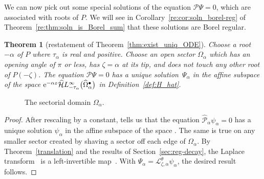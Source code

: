 \documentclass[10pt,a4paper]{amsart}
\newcommand{\singexp}[2]{\mathcal{H}L^\infty_{#1, #2}}
\newcommand{\singexpalg}[1]{\singexp{#1}{\bullet}}
\newcommand{\dualsingexp}[1]{\widehat{\mathcal{H}}L^\infty_{#1}}
\newcommand{\laplace}{\mathcal{L}}
\numberwithin{equation}{section}
\newtheorem{Theorem}{Theorem}[section]
\begin{document}
We can now pick out some special solutions of the equation $\mathcal{P}\Psi = 0$, which are associated with roots of $P$. We will see in Corollary~\ref{re:cor:soln_borel-reg} of Theorem~\ref{re:thm:soln_is_Borel_sum} that these solutions are Borel regular.
\begin{Theorem}[restatement of Theorem~\ref{thm:exist_uniq_ODE}]\label{re:thm:exist_uniq_ODE}
Choose a root $-\alpha$ of $P$ where $\tau_\alpha$ is real and positive. Choose an open sector $\Omega_\alpha$ which has an opening angle of $\pi$ or less, has $\zeta = \alpha$ at its tip, and does not touch any other root of $P(-\zeta)$. The equation $\mathcal{P}\Psi = 0$ has a unique solution~$\Psi_\alpha$ in the affine subspace
\smash{${\rm e}^{-\alpha z} \bigl[ z^{-\tau_\alpha} + \dualsingexp{-\tau_\alpha-1}\bigl(\widehat{\Omega}_\alpha^\bullet\bigr) \bigr] $}
of the space ${\rm e}^{-\alpha z} \dualsingexp{-\tau_\alpha}\bigl(\widehat{\Omega}_\alpha^\bullet\bigr)$ in Definition~{\rm\ref{def:H_hat}}.
\end{Theorem}
\begin{figure}[!ht]\centering\vspace{-18mm}
\hspace*{-25mm}\vspace{-12mm}

\caption{The sectorial domain $\Omega_\alpha$.}\label{fig:sectorial_domain--with roots P}
\end{figure}
\begin{proof}
After rescaling by a constant, \cite[Theorem~4.6]{reg-sing-volterra} tells us that the equation $\hat{\mathcal{P}}_\alpha \psi_\alpha = 0$ has a unique solution $\psi_\alpha$ in the affine subspace
\smash{$ \frac{\zeta^{\tau_\alpha-1}}{\Gamma(\tau_\alpha)} + \singexpalg{\tau_\alpha}(\Omega_\alpha) $}
of the space \smash{$\singexpalg{\tau_\alpha-1}(\Omega_\alpha)$}. The same is true on any smaller sector created by shaving a sector off each edge of $\Omega_\alpha$. By Theorem~\ref{translation} and the results of Section~\ref{sec:reg-decay}, the Laplace transform~\smash{$\laplace^\theta_{\zeta, \alpha}$} is a left-invertible map~\smash{$\singexpalg{\tau_\alpha}(\Omega_\alpha) \to {\rm e}^{-\alpha z} \dualsingexp{-\tau_\alpha-1}\bigl(\widehat{\Omega}_\alpha^\bullet\bigr)$}.
With $\Psi_\alpha = \laplace^\theta_{\zeta, \alpha} \psi_\alpha$, the desired result follows.
\end{proof}
\end{document}
